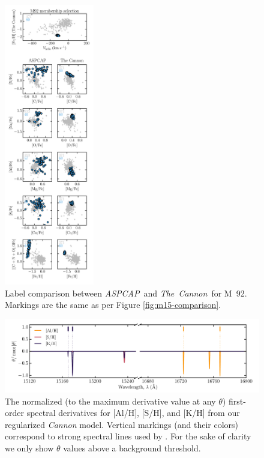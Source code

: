 \documentclass[12pt,preprint]{aastex6}
\newcommand{\project}[1]{\textsl{#1}}
\newcommand{\TheCannon}{\project{The~Cannon}}
\newcommand{\acronym}[1]{{\small{#1}}}
\newcommand{\aspcap}{\project{\acronym{ASPCAP}}}
\begin{document}
\begin{figure}[p]
\centering
\includegraphics[width=0.35\textwidth]{M92_comparison.pdf}
\caption{Label comparison between \aspcap\ and \TheCannon\ for M~92.
Markings are the same as per Figure \ref{fig:m15-comparison}.
\label{fig:m92-comparison}}
\end{figure}

\clearpage

\begin{figure}[p]
\includegraphics[width=\textwidth]{line-identification.pdf}
\caption{The normalized (to the maximum derivative value at any $\theta$) first-order spectral derivatives for [Al/H], [S/H], and [K/H] from our regularized \emph{Cannon} model. Vertical markings (and their colors) correspond to strong spectral lines used by \citet{Smith_2013}. For the sake of clarity we only show $\theta$ values above a background threshold.\label{fig:line-identification}}
\end{figure}
\end{document}
